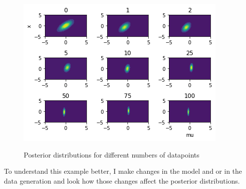 \documentclass{article}
\begin{document}
\begin{figure}
	\includegraphics[width=\textwidth]{images/posterior_different_data_sizes.png}
	\label{fig:posterior_different_data_sizes}
	\caption[Posterior distributions for different numbers of datapoints]{Posterior distributions for different numbers of datapoints}
\end{figure}

To understand this example better, I make changes in the model and or in the data generation and look how those changes affect the posterior distributions. 

%

\end{document}
